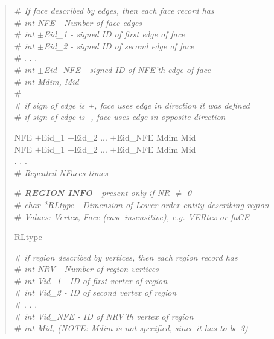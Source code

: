 \documentclass[12pt]{article}
\begin{document}
\begin{verse}
\# \textit{If face described by edges, then each face record has} \\
\# \textit{int NFE - Number of face edges} \\
\# \textit{int $\pm$Eid\_1 - signed ID of first edge of face} \\
\# \textit{int $\pm$Eid\_2 - signed ID of second edge of face} \\
\# . . . \\
\# \textit{int $\pm$Eid\_NFE - signed ID of NFE'th edge of face} \\
\# \textit{int Mdim, Mid} \\
\# \\
\# \textit{if sign of edge is +, face uses edge in direction it was defined} \\
\# \textit{if sign of edge is -, face uses edge in opposite direction} \\
\vspace{1ex}

NFE \hspace{0.5ex} $\pm$Eid\_1 \hspace{0.5ex} $\pm$Eid\_2 \hspace{0.5ex} ... \hspace{0.5ex} $\pm$Eid\_NFE \hspace{0.5ex} Mdim Mid \\
NFE \hspace{0.5ex} $\pm$Eid\_1 \hspace{0.5ex} $\pm$Eid\_2 \hspace{0.5ex} ... \hspace{0.5ex} $\pm$Eid\_NFE \hspace{0.5ex} Mdim Mid \\
. . . \\
\# \textit{Repeated NFaces times}
\vspace{2ex}\vspace{1ex}


\# \textit{\textbf{REGION INFO} - present only if NR $\ne$ 0} \\
\# \textit{char *RLtype - Dimension of Lower order entity describing region} \\
\# \textit{Values: Vertex, Face (case insensitive), e.g. VERtex or faCE}
\vspace{1ex}

RLtype
\vspace{1ex}

\# \textit{if region described by vertices, then each region record has} \\
\# \textit{int NRV - Number of region vertices} \\
\# \textit{int Vid\_1 - ID of first vertex of region} \\
\# \textit{int Vid\_2 - ID of second vertex of region} \\
\# . . . \\
\# \textit{int Vid\_NFE - ID of NRV'th vertex of region} \\
\# \textit{int Mid, (NOTE: Mdim is not specified, since it has to be 3)}
\vspace{1ex}


\end{verse}
\end{document}
